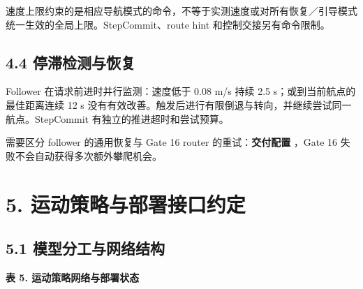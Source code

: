 \documentclass[
  10pt,
  a4paper,
]{article}
\begin{document}
速度上限约束的是相应导航模式的命令，不等于实测速度或对所有恢复／引导模式统一生效的全局上限。StepCommit、route
hint 和控制交接另有命令限制。

\subsection{4.4
停滞检测与恢复}\label{ux505cux6edeux68c0ux6d4bux4e0eux6062ux590d}

Follower 在请求前进时并行监测：速度低于 0.08 m/s 持续 2.5
s；或到当前航点的最佳距离连续 12 s
没有有效改善。触发后进行有限倒退与转向，并继续尝试同一航点。StepCommit
有独立的推进超时和尝试预算。

需要区分 follower 的通用恢复与 Gate 16 router 的重试：\textbf{交付配置
{\ttfamily\small{}}}，Gate 16
失败不会自动获得多次额外攀爬机会。

\Needspace{240pt}

\section{5.
运动策略与部署接口约定}\label{ux8fd0ux52a8ux7b56ux7565ux4e0eux90e8ux7f72ux63a5ux53e3ux7ea6ux5b9a}

\subsection{5.1
模型分工与网络结构}\label{ux6a21ux578bux5206ux5de5ux4e0eux7f51ux7edcux7ed3ux6784}

{\small\sffamily\bfseries\color{ReportGray}表 5. 运动策略网络与部署状态\par}
\vspace{-4pt}
\end{document}
